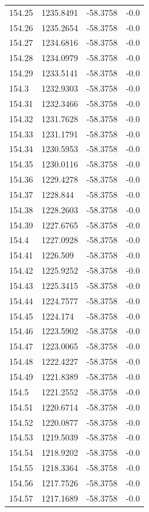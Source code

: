 \begin{table}[H]
\begin{tabular}{llll}
154.25 & 1235.8491 & -58.3758 & -0.0 \\
154.26 & 1235.2654 & -58.3758 & -0.0 \\
154.27 & 1234.6816 & -58.3758 & -0.0 \\
154.28 & 1234.0979 & -58.3758 & -0.0 \\
154.29 & 1233.5141 & -58.3758 & -0.0 \\
154.3 & 1232.9303 & -58.3758 & -0.0 \\
154.31 & 1232.3466 & -58.3758 & -0.0 \\
154.32 & 1231.7628 & -58.3758 & -0.0 \\
154.33 & 1231.1791 & -58.3758 & -0.0 \\
154.34 & 1230.5953 & -58.3758 & -0.0 \\
154.35 & 1230.0116 & -58.3758 & -0.0 \\
154.36 & 1229.4278 & -58.3758 & -0.0 \\
154.37 & 1228.844 & -58.3758 & -0.0 \\
154.38 & 1228.2603 & -58.3758 & -0.0 \\
154.39 & 1227.6765 & -58.3758 & -0.0 \\
154.4 & 1227.0928 & -58.3758 & -0.0 \\
154.41 & 1226.509 & -58.3758 & -0.0 \\
154.42 & 1225.9252 & -58.3758 & -0.0 \\
154.43 & 1225.3415 & -58.3758 & -0.0 \\
154.44 & 1224.7577 & -58.3758 & -0.0 \\
154.45 & 1224.174 & -58.3758 & -0.0 \\
154.46 & 1223.5902 & -58.3758 & -0.0 \\
154.47 & 1223.0065 & -58.3758 & -0.0 \\
154.48 & 1222.4227 & -58.3758 & -0.0 \\
154.49 & 1221.8389 & -58.3758 & -0.0 \\
154.5 & 1221.2552 & -58.3758 & -0.0 \\
154.51 & 1220.6714 & -58.3758 & -0.0 \\
154.52 & 1220.0877 & -58.3758 & -0.0 \\
154.53 & 1219.5039 & -58.3758 & -0.0 \\
154.54 & 1218.9202 & -58.3758 & -0.0 \\
154.55 & 1218.3364 & -58.3758 & -0.0 \\
154.56 & 1217.7526 & -58.3758 & -0.0 \\
154.57 & 1217.1689 & -58.3758 & -0.0 \\

\end{tabular}
\end{table}
